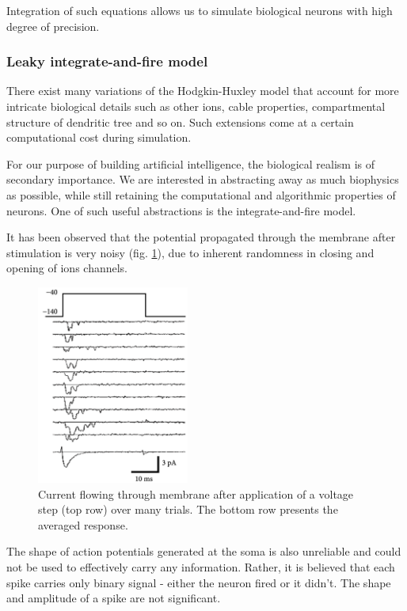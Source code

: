 \documentclass[12pt]{article}
\begin{document}
Integration of such equations allows us to simulate biological neurons with high degree of precision.

\subsubsection{Leaky integrate-and-fire model}

There exist many variations of the Hodgkin-Huxley model that account for more intricate biological details such as other ions, cable properties, compartmental structure of dendritic tree and so on. Such extensions come at a certain computational cost during simulation.

For our purpose of building artificial intelligence, the biological realism is of secondary importance. We are interested in abstracting away as much biophysics as possible, while still retaining the computational and algorithmic properties of neurons. One of such useful abstractions is the integrate-and-fire model.

It has been observed that the potential propagated through the membrane after stimulation is very noisy \cite{neuronal_dynamics} (fig. \ref{fig:membrane_potential_spike}), due to inherent randomness in closing and opening of ions channels. 
\begin{figure}[!htbp]
	\centering
	\includegraphics[width=5cm]{membrane_potential_spike}
	\caption{Current flowing through membrane after application of a voltage step (top row) over many trials. The bottom row presents the averaged response.}
	\label{fig:membrane_potential_spike}
\end{figure} 
The shape of action potentials generated at the soma is also unreliable and could not be used to effectively carry any information. Rather, it is believed that each spike carries only binary signal - either the neuron fired or it didn't. The shape and amplitude of a spike are not significant.
\end{document}
